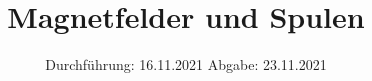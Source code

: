 

\subject{V308}
\title{Magnetfelder und Spulen}
\date{%
  Durchführung: 16.11.2021
  \hspace{3em}
  Abgabe: 23.11.2021
}


\setlength{\parindent}{0pt} %

\maketitle
\thispagestyle{empty}
\tableofcontents
\newpage








\printbibliography{}


